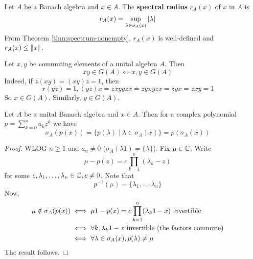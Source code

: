 \documentclass{article}
\begin{document}
\begin{dfn*}
  Let $A$ be a Banach algebra and $x \in A$. The {\bf spectral radius} $r_A(x)$ of $x$ in $A$ is
  $$r_A(x) = \sup_{\lambda \in \sigma_A(x)} \left\lvert \lambda\right\rvert$$
  From Theorem \ref{thm:spectrum-nonempty}, $r_A(x)$ is well-defined and $r_A(x) \le \left\lVert x\right\rVert$.
\end{dfn*}

\begin{note}
  Let $x, y$ be commuting elements of a unital algebra $A$. Then
  $$xy \in G(A) \iff x, y \in G(A)$$
  Indeed, if $z(xy) = (xy)z = 1$, then
  $$x(yz) = 1, (yz)x = zxyyzx = zyxyzx = zyx = zxy = 1$$
  So $x \in G(A)$. Similarly, $y \in G(A)$.
\end{note}

\begin{lem}\label{lem:poly-smt}
  Let $A$ be a unital Banach algebra and $x \in A$. Then for a complex polynomial $p = \sum_{k = 0}^n a_k z^k$ we have
  $$\sigma_A(p(x)) = \{p(\lambda) \mid \lambda \in \sigma_A(x)\} = p(\sigma_A(x))$$
\end{lem}
\begin{proof}
  WLOG $n \ge 1$ and $a_n \ne 0$ ($\sigma_A(\lambda 1) = \{\lambda\}$). Fix $\mu \in \mathbb C$. Write
  $$\mu - p(z) = c\prod_{k = 1}^n (\lambda_k - z)$$
  for some $c, \lambda_1, \dots, \lambda_n \in \mathbb C, c \ne 0$. Note that
  $$p^{-1}(\mu) = \{\lambda_1, \dots, \lambda_n\}$$
  Now,
  \begin{align*}
    \mu \notin \sigma_A(p(x))
    & \iff \mu 1 - p(x) = c \prod_{k = 1}^n (\lambda_k 1 - x) \text{ invertible} \\
    & \iff \forall k, \lambda_k 1 - x \text{ invertible (the factors commute)} \\
    & \iff \forall \lambda \in \sigma_A(x), p(\lambda) \ne \mu
  \end{align*}
  The result follows.
\end{proof}
\end{document}
